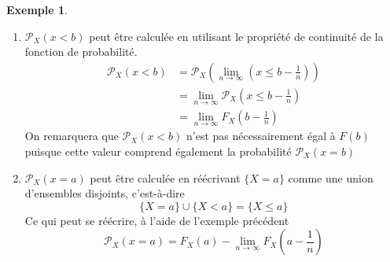 \documentclass[a4paper,12pt]{report}
\theoremstyle{definition}
\newcommand{\ra}{\rightarrow}
\renewcommand{\(}{\left(}
\renewcommand{\)}{\right)}
\renewcommand{\P}{\mathcal{P}}
\newtheorem{exmp}[thm]{Exemple}
\begin{document}
            \begin{exmp}
                ${}$
                \begin{enumerate}[label =(\roman*)]
                    \item $\P_X(x < b)$ peut être calculée en utilisant le propriété de continuité de la fonction de probabilité. 
                    \begin{align*}
                        \P_X(x < b) &= \P_X \left(\displaystyle{\lim_{n \ra \infty}}\left( x \leq b - \frac{1}{n} \right)\right)\\
                        &= \displaystyle{\lim_{n \ra \infty}}\P_X\left( x \leq b - \frac{1}{n}\right)\\
                        &= \displaystyle{\lim_{n \ra \infty}} F_X\left(b - \frac{1}{n}\right)
                    \end{align*}
                    On remarquera que $\P_X(x <b)$ n'est pas nécessairement égal à $F(b)$ puisque cette valeur comprend également la probabilité $\P_X(x = b)$
                    
                    \item $\P_X(x = a)$ peut être calculée en réécrivant $\{X = a\}$ comme une union d'ensembles disjoints, c'est-à-dire
                    $$\{X = a\} \cup \{ X < a\} = \{X \leq a\} $$
                    Ce qui peut se réécrire, à l'aide de l'exemple précédent 
                    $$\P_X(x = a) = F_X(a) - \displaystyle{\lim_{n \ra \infty}} F_X\left(a - \frac{1}{n}\right)$$
                \end{enumerate}
            \end{exmp}
            
\end{document}
